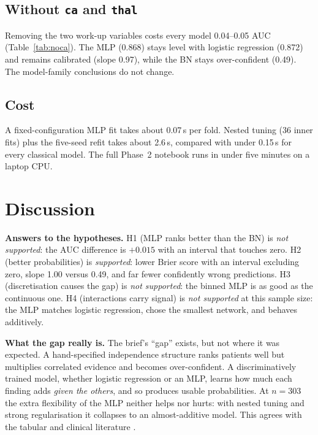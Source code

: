 \documentclass[conference]{IEEEtran}
\begin{document}
\subsection{Without \texttt{ca} and \texttt{thal}}
Removing the two work-up variables costs every model 0.04--0.05 AUC (Table~\ref{tab:noca}). The MLP (0.868) stays level with logistic regression (0.872) and remains calibrated (slope 0.97), while the BN stays over-confident (0.49). The model-family conclusions do not change.

\begin{table}[!t]
\caption{Models fitted without \texttt{ca} and \texttt{thal} (same 25 splits)}
\label{tab:noca}
\centering
\footnotesize\setlength{\tabcolsep}{3.5pt}

\end{table}

\subsection{Cost}
A fixed-configuration MLP fit takes about 0.07\,s per fold. Nested tuning (36 inner fits) plus the five-seed refit takes about 2.6\,s, compared with under 0.15\,s for every classical model. The full Phase~2 notebook runs in under five minutes on a laptop CPU.


\section{Discussion}
\textbf{Answers to the hypotheses.} H1 (MLP ranks better than the BN) is \emph{not supported}: the AUC difference is $+0.015$ with an interval that touches zero. H2 (better probabilities) is \emph{supported}: lower Brier score with an interval excluding zero, slope 1.00 versus 0.49, and far fewer confidently wrong predictions. H3 (discretisation causes the gap) is \emph{not supported}: the binned MLP is as good as the continuous one. H4 (interactions carry signal) is \emph{not supported} at this sample size: the MLP matches logistic regression, chose the smallest network, and behaves additively.

\textbf{What the gap really is.} The brief's ``gap'' exists, but not where it was expected. A hand-specified independence structure ranks patients well but multiplies correlated evidence and becomes over-confident. A discriminatively trained model, whether logistic regression or an MLP, learns how much each finding adds \emph{given the others}, and so produces usable probabilities. At $n=303$ the extra flexibility of the MLP neither helps nor hurts: with nested tuning and strong regularisation it collapses to an almost-additive model. This agrees with the tabular and clinical literature \cite{christodoulou2019}.
\end{document}
